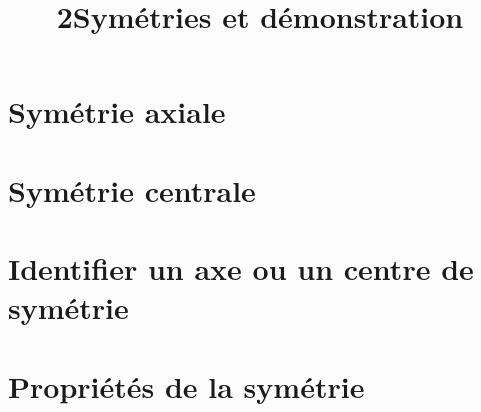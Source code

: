 \documentclass[12pt,a4paper]{article}
\date{}
\title{\textcircled{{\normalsize{2}}}Symétries et démonstration}
\begin{document}
\maketitle








\section{Symétrie axiale}




\newpage

\section{Symétrie centrale}




\newpage

\section{Identifier un axe ou un centre de symétrie}



\newpage
\section{Propriétés de la symétrie}


\end{document}
